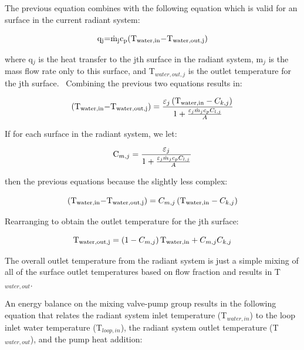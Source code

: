 The previous equation combines with the following equation which is valid for an surface in the current radiant system:

\begin{equation}
{{\rm{q}}_{\rm{j}}}{\rm{  =  }}{{\rm{\dot m}}_{\rm{j}}}{{\rm{c}}_{\rm{p}}}{\rm{(}}{{\rm{T}}_{{\rm{water,in}}}}{\rm{  -  }}{{\rm{T}}_{{\rm{water,out,j}}}}{\rm{)}}
\end{equation}

where q\(_{j}\) is the heat transfer to the jth surface in the radiant system, m\(_{j}\) is the mass flow rate only to this surface, and T\(_{water,out,j}\) is the outlet temperature for the jth surface.~ Combining the previous two equations results in:

\begin{equation}
{\rm{(}}{{\rm{T}}_{{\rm{water,in}}}}{\rm{  -  }}{{\rm{T}}_{{\rm{water,out,j}}}}{\rm{)}} = \frac{{{\varepsilon_j}\left( {{{\rm{T}}_{{\rm{water,in}}}} - {C_{k,j}}} \right)}}{{1 + \frac{{{\varepsilon_j}{{\dot m}_j}{c_p}{C_{l,j}}}}{A}}}
\end{equation}

If for each surface in the radiant system, we let:

\begin{equation}
{{\rm{C}}_{m,j}} = \frac{{{\varepsilon_j}}}{{1 + \frac{{{\varepsilon_j}{{\dot m}_j}{c_p}{C_{l,j}}}}{A}}}
\end{equation}

then the previous equations because the slightly less complex:

\begin{equation}
{\rm{(}}{{\rm{T}}_{{\rm{water,in}}}}{\rm{  -  }}{{\rm{T}}_{{\rm{water,out,j}}}}{\rm{)}} = {C_{m,j}}\left( {{{\rm{T}}_{{\rm{water,in}}}} - {C_{k,j}}} \right)
\end{equation}

Rearranging to obtain the outlet temperature for the jth surface:

\begin{equation}
{{\rm{T}}_{{\rm{water,out,j}}}} = \left( {1 - {C_{m,j}}} \right){{\rm{T}}_{{\rm{water,in}}}} + {C_{m,j}}{C_{k,j}}
\end{equation}

The overall outlet temperature from the radiant system is just a simple mixing of all of the surface outlet temperatures based on flow fraction and results in T\(_{water,out}\).

An energy balance on the mixing valve-pump group results in the following equation that relates the radiant system inlet temperature (T\(_{water,in}\)) to the loop inlet water temperature (T\(_{loop,in}\)), the radiant system outlet temperature (T\(_{water,out}\)), and the pump heat addition:

